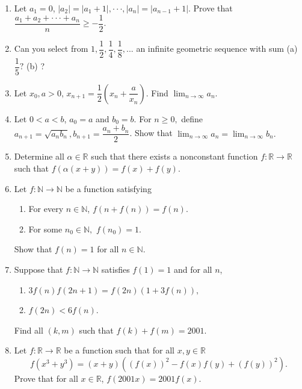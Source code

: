 \documentclass[12pt]{article}
\begin{document}
\begin{enumerate}
    \item Let $a_{1}=0$, $|a_{2}|=|a_{1}+1|,\cdot\cdot\cdot,|a_{n}|=|a_{n-1}+1|$. Prove that $\dfrac{a_{1}+a_{2}+\cdot\cdot\cdot+a_{n}}{n}\ge-\dfrac{1}{2}.$

    \item Can you select from $1,\dfrac{1}{2},\dfrac{1}{4},\dfrac{1}{8},...$ an infinite geometric sequence with sum (a) $\dfrac{1}{5}?$ (b) ?

    \item Let $x_{0}, a>0$, $x_{n+1}=\dfrac{1}{2}(x_{n}+\dfrac{a}{x_{n}})$. Find $\lim_{n\rightarrow\infty}a_{n}$.

    \item Let $0<a<b$, $a_{0}=a$ and $b_{0}=b.$ For $n\ge0,$ define $a_{n+1}=\sqrt{a_{n}b_{n}}, b_{n+1}=\dfrac{a_{n}+b_{n}}{2}$. Show that $\lim_{n\rightarrow\infty}a_{n}=\lim_{n\rightarrow\infty}b_{n}.$

    \item Determine all $\alpha\in\mathbb{R}$ such that there exists a nonconstant function $f:\mathbb{R}\rightarrow\mathbb{R}$ such that $f(\alpha(x+y))=f(x)+f(y)$.

    \item Let $f:\mathbb{N}\rightarrow\mathbb{N}$ be a function satisfying
    \begin{enumerate}
        \item[(a)] For every $n\in\mathbb{N}$, $f(n+f(n))=f(n)$.
        \item[(b)] For some $n_{0}\in\mathbb{N},$ $f(n_{0})=1$.
    \end{enumerate}
    Show that $f(n)=1$ for all $n\in\mathbb{N}$.

    \item Suppose that $f:\mathbb{N}\rightarrow\mathbb{N}$ satisfies $f(1)=1$ and for all $n$,
    \begin{enumerate}
        \item[(a)] $3f(n)f(2n+1)=f(2n)(1+3f(n)),$
        \item[(b)] $f(2n)<6f(n)$.
    \end{enumerate}
    Find all $(k, m)$ such that $f(k)+f(m)=2001.$

    \item Let $f:\mathbb{R}\rightarrow\mathbb{R}$ be a function such that for all $x,y\in\mathbb{R}$
    $$f(x^{3}+y^{3})=(x+y)((f(x))^{2}-f(x)f(y)+(f(y))^{2}).$$
    Prove that for all $x\in\mathbb{R}$, $f(2001x)=2001f(x)$.


\end{enumerate}
\end{document}
